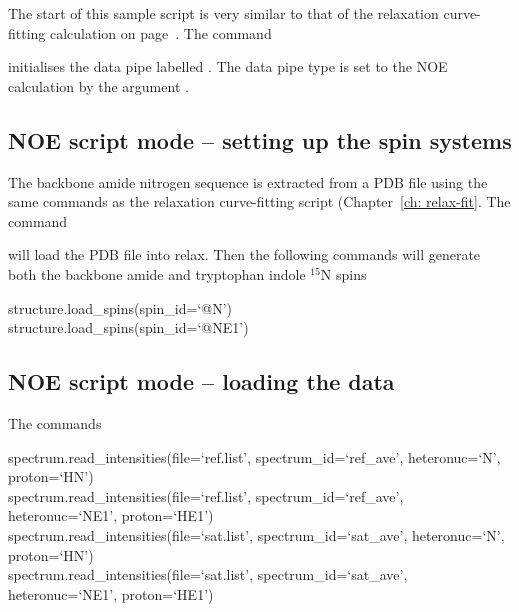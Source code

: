 The start of this sample script is very similar to that of the relaxation curve-fitting calculation on page~\pageref{Rx initialisation}.  The command


initialises the data pipe labelled .  The data pipe type is set to the NOE calculation by the argument .



\subsection{NOE script mode -- setting up the spin systems}

The backbone amide nitrogen sequence is extracted from a PDB file using the same commands as the relaxation curve-fitting script (Chapter~\ref{ch: relax-fit}.  The command


will load the PDB file  into relax.  Then the following commands will generate both the backbone amide and tryptophan indole $^{15}$N spins

\begin{exampleenv}
structure.load\_spins(spin\_id=`@N') \\
structure.load\_spins(spin\_id=`@NE1')
\end{exampleenv}



\subsection{NOE script mode -- loading the data}

The commands

\begin{exampleenv}
spectrum.read\_intensities(file=`ref.list', spectrum\_id=`ref\_ave', heteronuc=`N', proton=`HN') \\
spectrum.read\_intensities(file=`ref.list', spectrum\_id=`ref\_ave', heteronuc=`NE1', proton=`HE1') \\
spectrum.read\_intensities(file=`sat.list', spectrum\_id=`sat\_ave', heteronuc=`N', proton=`HN') \\
spectrum.read\_intensities(file=`sat.list', spectrum\_id=`sat\_ave', heteronuc=`NE1', proton=`HE1')
\end{exampleenv}

